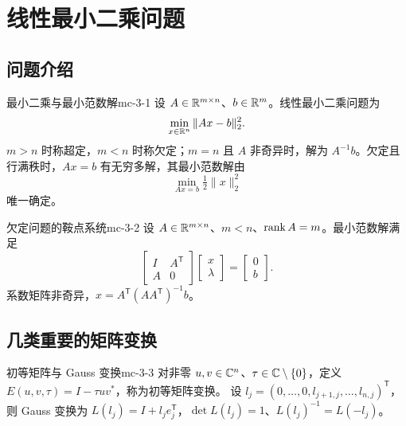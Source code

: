 \chapter{线性最小二乘问题}

\section{问题介绍}

\begin{definition}{最小二乘与最小范数解}{mc-3-1}
设 $A\in\mathbb{R}^{m\times n}$、$b\in\mathbb{R}^m$。线性最小二乘问题为
\[\min_{x\in\mathbb{R}^n}\|Ax-b\|_2^2.\]
$m>n$ 时称超定，$m<n$ 时称欠定；$m=n$ 且 $A$ 非奇异时，解为 $A^{-1}b$。欠定且行满秩时，$Ax=b$ 有无穷多解，其最小范数解由
\[\min_{Ax=b}\tfrac12\|x\|_2^2\]
唯一确定。
\end{definition}

\begin{proposition}{欠定问题的鞍点系统}{mc-3-2}
设 $A\in\mathbb{R}^{m\times n}$、$m<n$、$\operatorname{rank} A=m$。最小范数解满足
\[\begin{bmatrix}I&A^{\mathsf T}\\A&0\end{bmatrix}\begin{bmatrix}x\\\lambda\end{bmatrix}=\begin{bmatrix}0\\b\end{bmatrix}.\]
系数矩阵非奇异，$x=A^{\mathsf T}(AA^{\mathsf T})^{-1}b$。
\end{proposition}

\section{几类重要的矩阵变换}

\begin{definition}{初等矩阵与 Gauss 变换}{mc-3-3}
对非零 $u,v\in\mathbb{C}^n$、$\tau\in\mathbb{C}\setminus\{0\}$，定义 $E(u,v,\tau)=I-\tau uv^*$，称为初等矩阵变换。
设 $l_j=(0,\ldots,0,l_{j+1,j},\ldots,l_{n,j})^{\mathsf T}$，则 Gauss 变换为 $L(l_j)=I+l_je_j^{\mathsf T}$，$\det L(l_j)=1$、$L(l_j)^{-1}=L(-l_j)$。
\end{definition}

